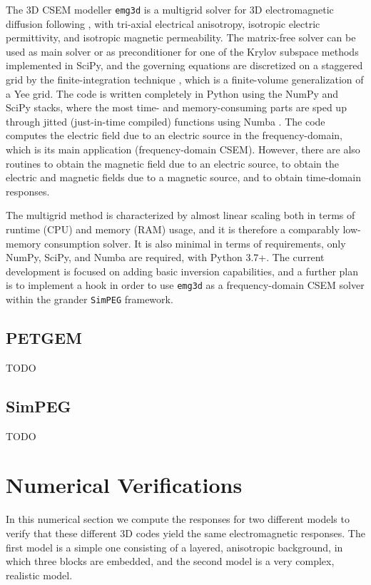 \documentclass[
    paper,
  ]{geophysics}
\newcommand{\emg}[2]{\texttt{emg#1#2}\xspace}
\newcommand{\simpeg}{\texttt{SimPEG}\xspace}
\begin{document}
The 3D CSEM modeller \emg3d is a multigrid \citep{CMMP.64.Fedorenko} solver for
3D electromagnetic diffusion following \cite{GP.06.Mulder}, with tri-axial
electrical anisotropy, isotropic electric permittivity, and isotropic magnetic
permeability. The matrix-free solver can be used as main solver or as
preconditioner for one of the Krylov subspace methods implemented in SciPy, and
the governing equations are discretized on a staggered grid by the
finite-integration technique \citep{AEU.77.Weiland}, which is a finite-volume
generalization of a Yee grid. The code is written completely in Python using
the NumPy and SciPy stacks, where the most time- and memory-consuming parts are
sped up through jitted (just-in-time compiled) functions using Numba
\citep{LLVM.15.Lam}. The code computes the electric field due to an electric
source in the frequency-domain, which is its main application (frequency-domain
CSEM). However, there are also routines to obtain the magnetic field due to an
electric source, to obtain the electric and magnetic fields due to a magnetic
source, and to obtain time-domain responses.

The multigrid method is characterized by almost linear scaling both in terms of
runtime (CPU) and memory (RAM) usage, and it is therefore a comparably
low-memory consumption solver. It is also minimal in terms of requirements,
only NumPy, SciPy, and Numba are required, with Python 3.7+. The current
development is focused on adding basic inversion capabilities, and a further
plan is to implement a hook in order to use \emg3d as a frequency-domain CSEM
solver within the grander \simpeg framework.

\subsection{PETGEM}

TODO


\subsection{SimPEG}

TODO


\clearpage  %
\section{Numerical Verifications}

In this numerical section we compute the responses for two different models to
verify that these different 3D codes yield the same electromagnetic responses.
The first model is a simple one consisting of a layered, anisotropic
background, in which three blocks are embedded, and the second model is a very
complex, realistic model.
\end{document}
